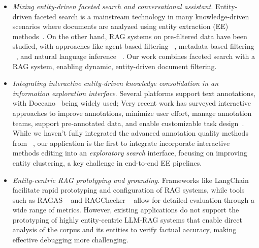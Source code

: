 
\begin{itemize}
    \item \textit{Mixing entity-driven faceted search and conversational assistant}.
    Entity-driven faceted search is a mainstream technology in many knowledge-driven scenarios where documents are analyzed using entity extraction (EE) methods~\cite{grafs,hirsch-etal-2021-ifacetsum}.
    On the other hand, RAG systems on pre-filtered data have been studied, with approaches like agent-based filtering ~\cite{poliakov2024multi}, metadata-based filtering ~\cite{chang2024main}, and natural language inference ~\cite{yoran2023making}. Our work combines faceted search with a RAG system, enabling dynamic, entity-driven document filtering.
    
    \item \textit{Integrating interactive entity-driven knowledge consolidation in an information exploration interface}.
    Several platforms support text annotations, with Doccano~\cite{doccano} being widely used; 
    Very recent work has surveyed interactive approaches to improve annotations, minimize user effort, manage annotation teams, support pre-annotated data, and enable customizable task design~\cite{de2024integrating}.
    While we haven't fully integrated the advanced annotation quality methods from ~\cite{klie-etal-2020-zero}, our application is the first to integrate incorporate interactive methods editing into an \textit{exploratory search} interface, focusing on improving entity clustering, a key challenge in end-to-end EE pipelines.




    \item \textit{Entity-centric RAG prototyping and grounding}.
    Frameworks like LangChain ~\cite{langchain} facilitate rapid prototyping and configuration of RAG systems, while tools such as RAGAS ~\cite{es-etal-2024-ragas} and RAGChecker ~\cite{ru2024ragchecker} allow for detailed evaluation through a wide range of metrics.
    However, existing applications do not support the prototyping of highly entity-centric LLM-RAG systems that enable direct analysis of the corpus and its entities to verify factual accuracy, making effective debugging more challenging.
\end{itemize}

